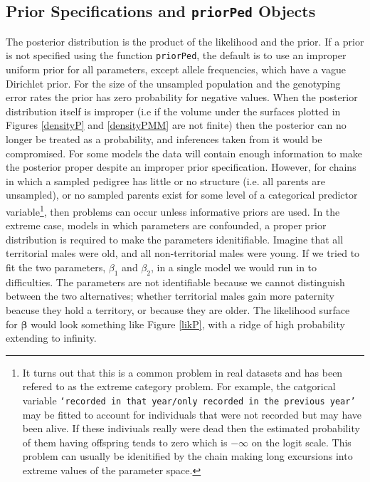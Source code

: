 \documentclass{article}
\begin{document}
\subsection{Prior Specifications and \texttt{priorPed} Objects}
\label{prior-sec}

The posterior distribution is the product of the likelihood and the prior. If a prior is not specified using the function \texttt{priorPed}, the default is to use an improper uniform prior for all parameters, except allele frequencies, which have a vague Dirichlet prior. For the size of the unsampled population and the genotyping error rates the prior has zero probability for negative values.  When the posterior distribution itself is improper (i.e if the volume under the surfaces plotted in Figures \ref{densityP} and \ref{densityPMM} are not finite) then the posterior can no longer be treated as a probability, and inferences taken from it would be compromised.  For some models the data will contain enough information to make the posterior proper despite an improper prior specification. However, for chains in which a sampled pedigree has little or no structure (i.e. all parents are unsampled), or no sampled parents exist for some level of a categorical predictor variable\footnote{It turns out that this is a common problem in real datasets and has been refered to as the extreme category problem.  For example, the catgorical variable \texttt{`recorded in that year/only recorded in the previous year'} may be fitted to account for individuals that were not recorded but may have been alive.  If these indiviuals really were dead then the estimated probability of them having offspring tends to zero which is $-\infty$ on the logit scale.  This problem can usually be idenitified by the chain making long excursions into extreme values of the parameter space.}, then problems can occur unless informative priors are used. In the extreme case, models in which parameters are confounded, a proper prior distribution is required to make the parameters idenitifiable.  Imagine that all territorial males were old, and all non-territorial males were young. If we tried to fit the two parameters, $\beta_{1}$ and $\beta_{2}$, in a single model we would run in to difficulties.  The parameters are not identifiable because we cannot distinguish between the two alternatives; whether territorial males gain more paternity beacuse they hold a territory, or because they are older.  The likelihood surface for $\bm{\beta}$ would look something like Figure \ref{likP}, with a ridge of high probability extending to infinity.\\  
\end{document}
